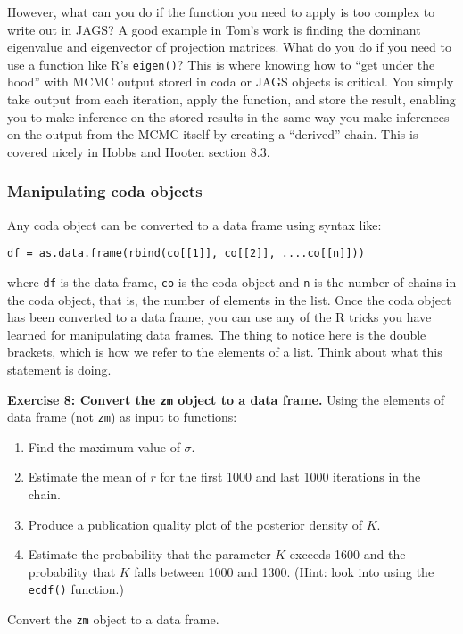 \documentclass[12pt,english]{article}
\begin{document}
{\begin{mdframed}[frametitle={Box 1: Using R to calculate derived quantities from MCMC objects}, backgroundcolor=black!10]
\noindent However, what can you do if the function you need to apply is too complex to write out in JAGS? A good example in Tom's work is finding the dominant eigenvalue and eigenvector of projection matrices. What do you do if you need to use a function like R's \texttt{eigen()}? This is where knowing how to ``get under the hood'' with MCMC output stored in coda or JAGS objects is critical. You simply take output from each iteration, apply the function, and store the result, enabling you to make inference on the stored results in the same way you make inferences on the output from the MCMC itself by creating a ``derived'' chain. This is covered nicely in Hobbs and Hooten \citeyearpar{hobbs2015bayesian} section 8.3.
\end{mdframed}

\subsubsection{Manipulating coda objects}

Any coda object can be converted to a data frame using syntax like:

\begin{Verbatim}
df = as.data.frame(rbind(co[[1]], co[[2]], ....co[[n]]))
\end{Verbatim}

\noindent where \texttt{df} is the data frame, \texttt{co} is the coda object and \texttt{n} is the number of chains in the coda object, that is, the number of elements in the list. Once the coda object has been converted to a data frame, you can use any of the R tricks you have learned for manipulating data frames. The thing to notice here is the double brackets, which is how we refer to the elements of a list. Think about what this statement is doing.

\bigskip
\belowcaptionskip=-20pt
\begin{exercise}
\begin{mdframed}
\doublespacing
\textbf{Exercise 8: Convert the \texttt{zm} object to a data frame.} Using the elements of data frame (not \texttt{zm}) as input to functions:
\begin{enumerate}
\item Find the maximum value of $\sigma$.
\item Estimate the mean of $r$ for the first 1000 and last 1000 iterations in the chain.
\item Produce a publication quality plot of the posterior density of $K$. 
\item Estimate the probability that the parameter $K$ exceeds 1600 and the probability that $K$ falls between 1000 and 1300. (Hint: look into using the \texttt{ecdf()} function.) 
\end{enumerate}
\end{mdframed}
\captionsetup{textformat=empty, labelformat=empty}
\caption[Convert the \texttt{zm} object to a data frame]{Convert the \texttt{zm} object to a data frame.}
\label{ex:coda conversion}
\end{exercise}
\belowcaptionskip=0pt

}
\end{document}
